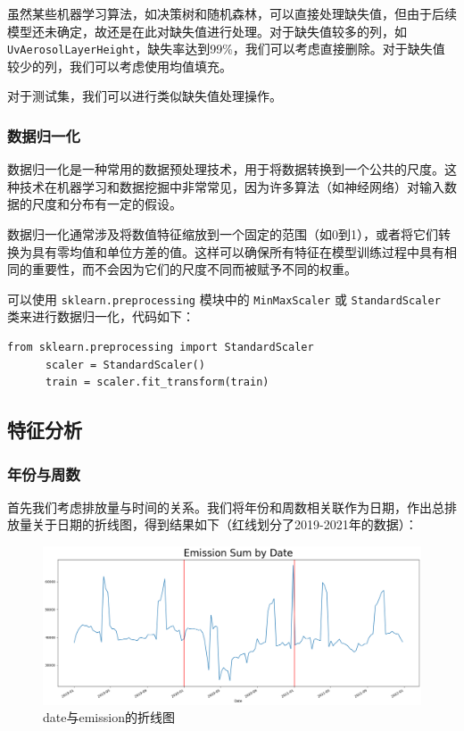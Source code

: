 \documentclass{ctexart}
\begin{document}
虽然某些机器学习算法，如决策树和随机森林，可以直接处理缺失值，但由于后续模型还未确定，故还是在此对缺失值进行处理。对于缺失值较多的列，如\texttt{UvAerosolLayerHeight}，缺失率达到99\%，我们可以考虑直接删除。对于缺失值较少的列，我们可以考虑使用均值填充。

对于测试集，我们可以进行类似缺失值处理操作。

\subsubsection{数据归一化}

数据归一化是一种常用的数据预处理技术，用于将数据转换到一个公共的尺度。这种技术在机器学习和数据挖掘中非常常见，因为许多算法（如神经网络）对输入数据的尺度和分布有一定的假设。

数据归一化通常涉及将数值特征缩放到一个固定的范围（如0到1），或者将它们转换为具有零均值和单位方差的值。这样可以确保所有特征在模型训练过程中具有相同的重要性，而不会因为它们的尺度不同而被赋予不同的权重。

可以使用 \texttt{sklearn.preprocessing} 模块中的 \texttt{MinMaxScaler} 或 \texttt{StandardScaler} 类来进行数据归一化，代码如下：

\begin{lstlisting}[style=Python]
      from sklearn.preprocessing import StandardScaler
      scaler = StandardScaler()
      train = scaler.fit_transform(train)
\end{lstlisting}

\subsection{特征分析}

\subsubsection{年份与周数}

首先我们考虑排放量与时间的关系。我们将年份和周数相关联作为日期，作出总排放量关于日期的折线图，得到结果如下（红线划分了2019-2021年的数据）：

\begin{figure}[H]
      \centering
      \includegraphics[width=1\textwidth]{output2.png}
      \caption{date与emission的折线图}
\end{figure}
\end{document}
